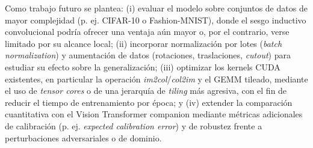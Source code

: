 \documentclass[conference]{IEEEtran}
\begin{document}
Como trabajo futuro se plantea: (i) evaluar el modelo sobre conjuntos de datos de mayor complejidad (p. ej. CIFAR-10 o Fashion-MNIST), donde el sesgo inductivo convolucional podría ofrecer una ventaja aún mayor o, por el contrario, verse limitado por su alcance local; (ii) incorporar normalización por lotes (\emph{batch normalization}) y aumentación de datos (rotaciones, traslaciones, \emph{cutout}) para estudiar su efecto sobre la generalización; (iii) optimizar los kernels CUDA existentes, en particular la operación \emph{im2col}/\emph{col2im} y el GEMM tileado, mediante el uso de \emph{tensor cores} o de una jerarquía de \emph{tiling} más agresiva, con el fin de reducir el tiempo de entrenamiento por época; y (iv) extender la comparación cuantitativa con el Vision Transformer companion mediante métricas adicionales de calibración (p. ej. \emph{expected calibration error}) y de robustez frente a perturbaciones adversariales o de dominio.
\end{document}
